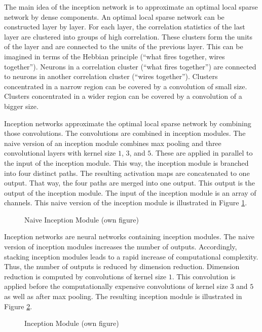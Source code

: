 The main idea of the inception network is to approximate an optimal local sparse network by dense components. An optimal local sparse network can be constructed layer by layer. 
For each layer, the correlation statistics of the last layer are clustered into groups of high correlation. These clusters form the units of the layer and are connected to the units of the previous layer. 
This can be imagined in terms of the Hebbian principle (\enquote{what fires together, wires together}). Neurons in a correlation cluster (\enquote{what fires together}) are connected to neurons in another correlation cluster (\enquote{wires together}).
Clusters concentrated in a narrow region can be covered by a convolution of small size. Clusters concentrated in a wider region can be covered by a convolution of a bigger size. \autocite{Szegedy.2015}
\par
Inception networks approximate the optimal local sparse network by combining those convolutions. The convolutions are combined in inception modules. The naive version of an inception module combines max pooling and three convolutional layers with kernel size $1$, $3$, and $5$. These are applied in parallel to the input of the inception module. This way, the inception module is branched into four distinct paths. The resulting activation maps are concatenated to one output. That way, the four paths are merged into one output. This output is the output of the inception module. The input of the inception module is an array of channels. This naive version of the inception module is illustrated in Figure \ref{fig:naiveinceptionmodule}. \autocite{Szegedy.2015}
\begin{figure}[H]
	\centering
	
	\caption{Naive Inception Module (own figure)} \label{fig:naiveinceptionmodule}
\end{figure}
Inception networks are neural networks containing inception modules. The naive version of inception modules increases the number of outputs. Accordingly, stacking inception modules leads to a rapid increase of computational complexity. Thus, the number of outputs is reduced by dimension reduction. Dimension reduction is computed by convolutions of kernel size $1$. This convolution is applied before the computationally expensive convolutions of kernel size $3$ and $5$ as well as after max pooling. The resulting inception module is illustrated in Figure \ref{fig:inceptionmodule}. \autocite{Szegedy.2015}
\begin{figure}[H]
	\centering
	
	\caption{Inception Module (own figure)} \label{fig:inceptionmodule}
\end{figure}
